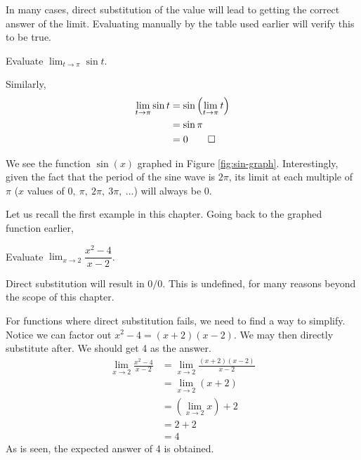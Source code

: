 In many cases, direct substitution of the value will lead to getting the correct answer of the limit. Evaluating manually by the table used earlier will verify this to be true.

\begin{exmp}
	Evaluate $\displaystyle\lim_{t\to \pi}\sin t$.
	\begin{soln}
		Similarly,
		\begin{align*}
			\lim_{t\to \pi}\sin t &= \sin\left(\lim_{t\to \pi} t\right)\\
			&= \sin \pi \\
			&= 0\qedhere
		\end{align*}
	\end{soln}
\end{exmp}

\begin{marginfigure}
	\centering
	\resizebox{\linewidth}{!}{%
	}
	\caption{$\sin(x)$ at $[0, 2\pi]$}
	\label{fig:sin-graph}
\end{marginfigure}

We see the function $\sin(x)$ graphed in Figure \ref{fig:sin-graph}. Interestingly, given the fact that the period of the sine wave is $2\pi$, its limit at each multiple of $\pi$ ($x$ values of $0,\ \pi,\ 2\pi,\ 3\pi,\ \ldots$) will always be 0.

Let us recall the first example in this chapter. Going back to the graphed function earlier,
\begin{exmp}
	Evaluate $\displaystyle\lim_{x\to 2} \dfrac{x^2-4}{x-2}$.
	\begin{soln}
		Direct substitution will result in $0/0$. This is undefined, for many reasons beyond the scope of this chapter.
		
		For functions where direct substitution fails, we need to find a way to simplify. Notice we can factor out $x^2-4=(x+2)(x-2)$. We may then directly substitute after. We should get 4 as the answer.
		\begin{align*}
			\lim_{x\to 2} \frac{x^2-4}{x-2} &= \lim_{x\to 2} \frac{(x+2)(x-2)}{x-2} \\
			&= \lim_{x\to 2} (x+2) \\
			&= \left(\lim_{x\to 2} x\right) + 2 \\
			&= 2+2 \\
			&= 4
		\end{align*}
		As is seen, the expected answer of 4 is obtained.
	\end{soln}
\end{exmp}


